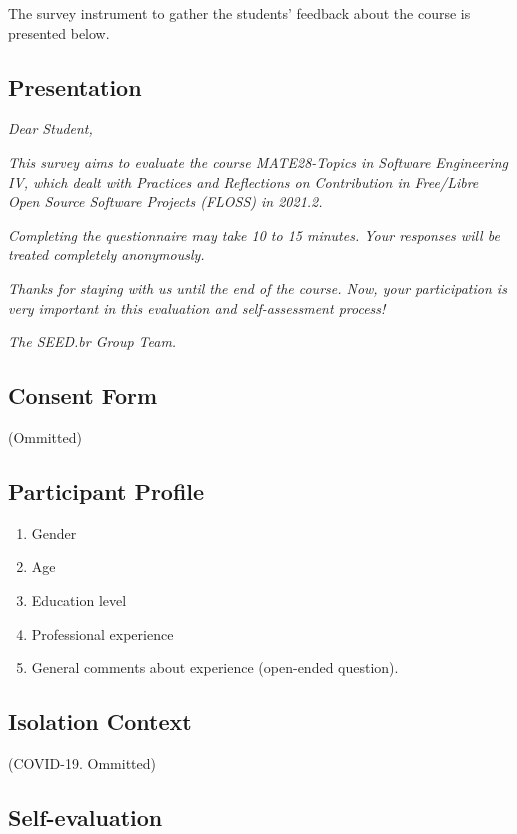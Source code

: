 
The survey instrument to gather the students' feedback about the course is presented below. 

\subsection{Presentation}
\textit{Dear Student,}

\textit{This survey aims to evaluate the course MATE28-Topics in Software Engineering IV, which dealt with Practices and Reflections on Contribution in Free/Libre Open Source Software Projects (FLOSS) in 2021.2.}

\textit{Completing the questionnaire may take 10 to 15 minutes. Your responses will be treated completely anonymously.}
 
\textit{Thanks for staying with us until the end of the course. Now, your participation is very important in this evaluation and self-assessment process!}

\textit{The SEED.br Group Team.}

\subsection{Consent Form} 
(Ommitted)

\subsection{Participant Profile}

\begin{enumerate}
    \item Gender
    \item Age
    \item Education level
    \item Professional experience
    \item General comments about experience (open-ended question).
\end{enumerate}

\subsection{Isolation Context}
(COVID-19. Ommitted)

\subsection{Self-evaluation}

